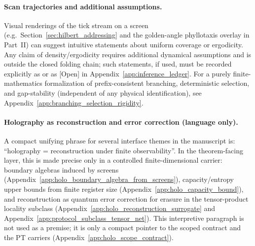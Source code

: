 \paragraph{Scan trajectories and additional assumptions.}
Visual renderings of the tick stream on a screen (e.g.\ Section~\ref{sec:hilbert_addressing} and the golden-angle phyllotaxis overlay in Part~II) can suggest intuitive statements about uniform coverage or ergodicity.
\AuditTag Any claim of density/ergodicity requires additional dynamical assumptions and is outside the closed folding chain; such statements, if used, must be recorded explicitly as \AuditTag or as \textsf{[Open]} in Appendix~\ref{app:inference_ledger}.
\AuditTag For a purely finite-mathematics formalization of prefix-consistent branching, deterministic selection, and gap-stability (independent of any physical identification), see Appendix~\ref{app:branching_selection_rigidity}.

\paragraph{Holography as reconstruction and error correction (language only).}
\AuditTag A compact unifying phrase for several interface themes in the manuscript is:
``holography = reconstruction under finite observability''.
In the theorem-facing layer, this is made precise only in a controlled finite-dimensional carrier:
boundary algebras induced by screens (Appendix~\ref{app:holo_boundary_algebra_from_screens}),
capacity/entropy upper bounds from finite register size (Appendix~\ref{app:holo_capacity_bound}),
and reconstruction as quantum error correction for erasure in the tensor-product locality subclass
(Appendix~\ref{app:holo_reconstruction_surrogate} and Appendix~\ref{app:protocol_subclass_tensor_net}).
This interpretive paragraph is not used as a premise; it is only a compact pointer to the scoped contract
and the PT carriers (Appendix~\ref{app:holo_scope_contract}).

